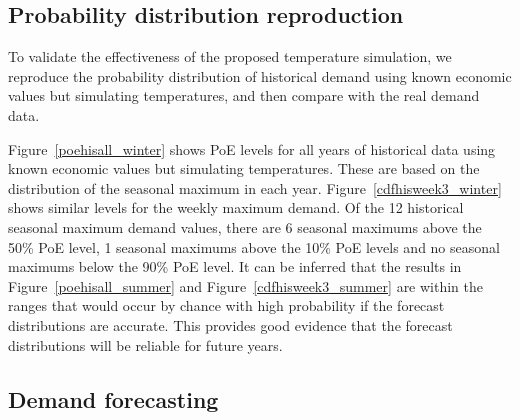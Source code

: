 \documentclass[11pt]{article}
\begin{document}



\subsection{Probability distribution reproduction}

To validate the effectiveness of the proposed temperature simulation, we reproduce the probability distribution of historical demand using known economic values but simulating temperatures, and then compare with the real demand data.




Figure~\ref{poehisall_winter} shows PoE levels for all years of historical data using known economic values but simulating temperatures. These are based on the distribution of the seasonal maximum in each year. Figure~\ref{cdfhisweek3_winter} shows similar levels for the weekly maximum demand. Of the 12 historical seasonal maximum demand values, there are 6 seasonal maximums above the 50\% PoE level, 1 seasonal maximums above the 10\% PoE levels and no seasonal maximums below the 90\% PoE level. 
It can be inferred that the results in Figure~\ref{poehisall_summer} and Figure~\ref{cdfhisweek3_summer} are within the ranges that would occur by chance with high probability if the forecast distributions are accurate. This provides good evidence that the forecast distributions will be reliable for future years.


\subsection{Demand forecasting}\label{sec:forecast}
\end{document}
